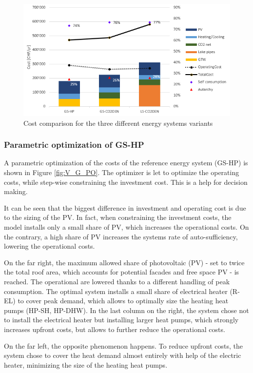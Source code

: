 \documentclass{article}
\begin{document}
\begin{figure}[htp]
	\centering
	\includegraphics[width=1\textwidth]{V_costs.PNG}
	\caption{Cost comparison for the three different energy systems variants}
	\label{fig:V_costs}
\end{figure}


\subsubsection{Parametric optimization of GS-HP}
A parametric optimization of the costs of the reference energy system (GS-HP) is shown in Figure \ref{fig:V_G_PO}. The optimizer is let to optimize the operating costs, while step-wise constraining the investment cost. This is a help for decision making.

It can be seen that the biggest difference in investment and operating cost is due to the sizing of the PV. In fact, when constraining the investment costs, the model installs only a small share of PV, which increases the operational costs. On the contrary, a high share of PV increases the systems rate of auto-sufficiency, lowering the operational costs. 

On the far right, the maximum allowed share of photovoltaic (PV) - set to twice the total roof area, which accounts for potential facades and free space PV - is reached. The operational are lowered thanks to a different handling of peak consumption. The optimal system installs a small share of electrical heater (R-EL) to cover peak demand, which allows to optimally size the heating heat pumps (HP-SH, HP-DHW). In the last column on the right, the system chose not to install the electrical heater but installing larger heat pumps, which strongly increases upfront costs, but allows to further reduce the operational costs.

On the far left, the opposite phenomenon happens. To reduce upfront costs, the system chose to cover the heat demand almost entirely with help of the electric heater, minimizing the size of the heating heat pumps.
\end{document}
